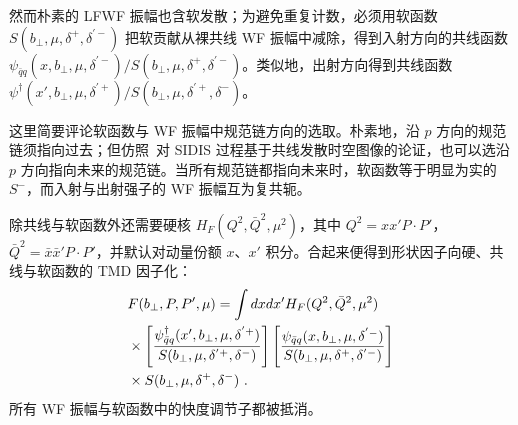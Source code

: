 然而朴素的 LFWF 振幅也含软发散；为避免重复计数，必须用软函数 $S(b_\perp,\mu,\delta^+,\delta^{'-})$ 把软贡献从裸共线 WF 振幅中减除，得到入射方向的共线函数 $\psi_{\bar q q}(x,b_\perp,\mu,\delta^{'-})/S(b_\perp,\mu,\delta^+,\delta^{'-})$。类似地，出射方向得到共线函数 $\psi^{\dagger}(x',b_\perp,\mu,\delta^{'+})/S(b_\perp,\mu,\delta^{'+},\delta^{-})$。

这里简要评论软函数与 WF 振幅中规范链方向的选取。朴素地，沿 $p$ 方向的规范链须指向过去；但仿照~\cite{Collins:2004nx}对 SIDIS 过程基于共线发散时空图像的论证，也可以选沿 $p$ 方向指向未来的规范链。当所有规范链都指向未来时，软函数等于明显为实的 $S^-$，而入射与出射强子的 WF 振幅互为复共轭。

除共线与软函数外还需要硬核 $H_F(Q^2,\bar Q^2,\mu^2)$，其中 $Q^2=xx'P\cdot P'$，$\bar Q^2=\bar x\bar x' P\cdot P'$，并默认对动量份额 $x$、$x'$ 积分。合起来便得到形状因子向硬、共线与软函数的 TMD 因子化：
\begin{align}\label{eq:form_fac_bare}
	&F(b_\perp,P,P',\mu)=\int dx dx' H_F(Q^2,\bar Q^2,\mu^2) \\ &\times \left[\frac{\psi_{\bar q q}^{\dagger}(x',b_\perp,\mu,\delta^{'+})}{S(b_\perp,\mu,\delta^{'+},\delta^-)}\right]\left[\frac{\psi_{\bar q q}(x,b_\perp,\mu,\delta^{'-})}{S(b_\perp,\mu,\delta^+,\delta^{'-})}\right]\nonumber \\
	&\times S(b_\perp,\mu,\delta^+,\delta^-) \ . \nonumber
\end{align}
所有 WF 振幅与软函数中的快度调节子都被抵消。

